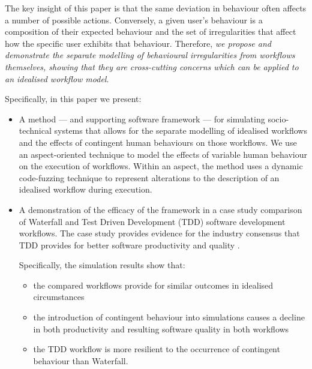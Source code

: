 \documentclass{llncs}
\begin{document}

The key insight of this paper is that the same deviation in behaviour often affects a number of possible actions.
Conversely, a given user's behaviour is a composition of their expected behaviour and the set of irregularities that
affect how the specific user exhibits that behaviour.  Therefore, \emph{we propose and demonstrate the separate
modelling of behavioural irregularities from workflows themselves, showing that they are cross-cutting concerns which can
be applied to an idealised workflow model}.

Specifically, in this paper we present:

\begin{itemize}

\item A method --- and supporting software framework --- for simulating socio-technical systems that allows for the separate
  modelling of idealised workflows and the effects of contingent human behaviours on those workflows.  We use an
  aspect-oriented technique \citep{filman01aspect} to model the effects of variable human behaviour on the execution of
  workflows.  Within an aspect, the method uses a dynamic code-fuzzing \citep{takanen08fuzzing} technique to represent
  alterations to the description of an idealised workflow during execution.

\item A demonstration of the efficacy of the framework in a case study comparison of Waterfall and Test Driven
  Development (TDD) software development workflows.  The case study provides evidence for the industry consensus that
  TDD provides for better software productivity and quality
  \citep{Bhat2006TestDrivenDevelopment,George2004TestDrivenDevelopment,Huang2009EmpiricalTestFirstProgramming}.

  Specifically, the simulation results show that:
	\begin{itemize}
		\item the compared workflows provide for similar outcomes in idealised circumstances
		\item the introduction of contingent behaviour into simulations causes a decline in both productivity and resulting software quality in both workflows
		\item the TDD workflow is more resilient to the occurrence of contingent behaviour than Waterfall.
	\end{itemize}

\end{itemize}
\end{document}
